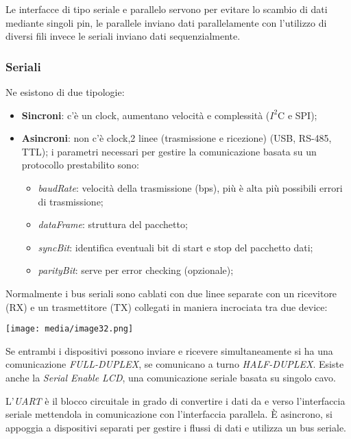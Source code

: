 Le interfacce di tipo seriale e parallelo servono per evitare lo scambio
di dati mediante singoli pin, le parallele inviano dati parallelamente
con l'utilizzo di diversi fili invece le seriali inviano dati
sequenzialmente.

\subsubsection{Seriali}\label{seriali}

Ne esistono di due tipologie:

\begin{itemize}
\item
  \textbf{Sincroni}: c'è un clock, aumentano velocità e complessità
  (\(I^{2}\)C e SPI);
\item
  \textbf{Asincroni}: non c'è clock,2 linee (trasmissione e ricezione)
  (USB, RS-485, TTL); i parametri necessari per gestire la comunicazione
  basata su un protocollo prestabilito sono:

  \begin{itemize}
  \item
    \emph{baudRate}: velocità della trasmissione (bps), più è alta più
    possibili errori di trasmissione;
  \item
    \emph{dataFrame}: struttura del pacchetto;
  \item
    \emph{syncBit}: identifica eventuali bit di start e stop del
    pacchetto dati;
  \item
    \emph{parityBit}: serve per error checking (opzionale);
  \end{itemize}
\end{itemize}

Normalmente i bus seriali sono cablati con due linee separate con un
ricevitore (RX) e un trasmettitore (TX) collegati in maniera incrociata
tra due device:

\texttt{[image: media/image32.png]}

Se entrambi i dispositivi possono inviare e ricevere simultaneamente si
ha una comunicazione \emph{FULL-DUPLEX}, se comunicano a turno
\emph{HALF-DUPLEX}. Esiste anche la \emph{Serial Enable LCD}, una
comunicazione seriale basata su singolo cavo.

L'\emph{UART} è il blocco circuitale in grado di convertire i dati da e
verso l'interfaccia seriale mettendola in comunicazione con
l'interfaccia parallela. È asincrono, si appoggia a dispositivi separati
per gestire i flussi di dati e utilizza un bus seriale.

